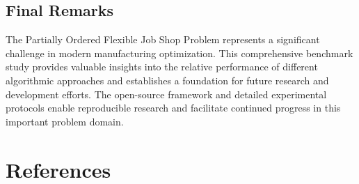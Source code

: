 \documentclass[11pt,a4paper]{article}
\begin{document}
\subsection{Final Remarks}

The Partially Ordered Flexible Job Shop Problem represents a significant challenge in modern manufacturing optimization. This comprehensive benchmark study provides valuable insights into the relative performance of different algorithmic approaches and establishes a foundation for future research and development efforts. The open-source framework and detailed experimental protocols enable reproducible research and facilitate continued progress in this important problem domain.


\section{References}
\end{document}
